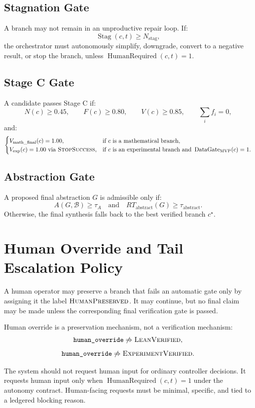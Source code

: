 \documentclass[11pt]{article}
\begin{document}
\subsection{Stagnation Gate}
A branch may not remain in an unproductive repair loop. If:
$$
\operatorname{Stag}(c,t)\geq N_{\text{stag}},
$$
the orchestrator must autonomously simplify, downgrade, convert to a negative result, or stop the branch, unless $\operatorname{HumanRequired}(c,t)=1$.

\subsection{Stage C Gate}
A candidate passes Stage C if:
$$
N(c)\geq0.45, \qquad F(c)\geq0.80, \qquad V(c)\geq0.85, \qquad \sum_i f_i=0,
$$
and:
$$
\begin{cases}
V_{\text{math\_final}}(c)=1.00, & \text{if } c \text{ is a mathematical branch},\\
V_{\text{exp}}(c)=1.00 \text{ via } \textsc{StopSuccess}, & \text{if } c \text{ is an experimental branch and } \operatorname{DataGate}_{\text{MVP}}(c)=1.
\end{cases}
$$

\subsection{Abstraction Gate}
A proposed final abstraction $G$ is admissible only if:
$$
A(G,\mathcal{B})\geq\tau_A
\quad\text{and}\quad
RT_{\text{abstract}}(G)\geq\tau_{\text{abstract}}.
$$
Otherwise, the final synthesis falls back to the best verified branch $c^\star$.

\section{Human Override and Tail Escalation Policy}

A human operator may preserve a branch that fails an automatic gate only by assigning it the label $\textsc{HumanPreserved}$. It may continue, but no final claim may be made unless the corresponding final verification gate is passed.

Human override is a preservation mechanism, not a verification mechanism:
$$
\texttt{human\_override}\not\Rightarrow\textsc{LeanVerified},
$$
$$
\texttt{human\_override}\not\Rightarrow\textsc{ExperimentVerified}.
$$

The system should not request human input for ordinary controller decisions. It requests human input only when $\operatorname{HumanRequired}(c,t)=1$ under the autonomy contract. Human-facing requests must be minimal, specific, and tied to a ledgered blocking reason.
\end{document}
